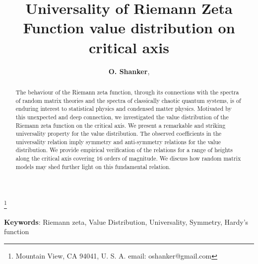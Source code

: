 \documentclass[twoside]{article}
\begin{document}


\newtheorem{theorem}{Theorem}[section]
\newtheorem{lemma}[theorem]{Lemma}

\theoremstyle{definition}
\newtheorem{definition}[theorem]{Definition}
\newtheorem{example}[theorem]{Example}
\newtheorem{xca}[theorem]{Exercise}

\theoremstyle{remark}
\newtheorem{remark}[theorem]{Remark}



\date{}
\lhead[]{}
\rhead[]{}

\title{\bf{Universality of Riemann Zeta Function value distribution on critical axis}}

\maketitle


\author{{\textbf{O. Shanker}},}
\thanks{ Mountain View, CA 94041, U. S. A. email: oshanker@gmail.com}

\thispagestyle{fancy}

\begin{abstract}
The behaviour of the Riemann zeta function, through its connections with
the spectra of random matrix theories and the spectra of classically 
chaotic quantum systems, is of enduring interest to 
statistical physics and condensed matter physics. Motivated by this unexpected and 
deep connection, we investigated
the value distribution of the Riemann zeta function on the critical axis.
We present a remarkable and striking universality property for the value distribution. 
The observed coefficients 
in the universality relation imply
symmetry and anti-symmetry relations for the value distribution.
We provide empirical verification of the relations for a range of heights along the critical
axis covering $16$ orders of magnitude. We discuss how random matrix models may shed further
light on this fundamental relation.

\end{abstract}
{\textbf {Keywords}:} Riemann zeta, Value Distribution, Universality, Symmetry, Hardy's function
\\
\end{document}
